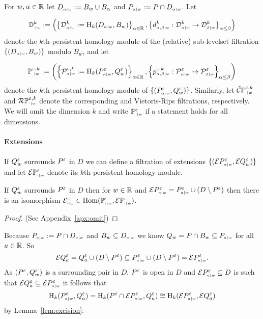 For $w,\alpha\in\R$ let $D\subi{w}{\alpha} := B_w\cup B_\alpha$ and $P\subi{w}{\alpha} := P\cap D\subi{w}{\alpha}$.
%
Let

\[ \DD{w}^k := \left(\left\{\D{w}{\alpha}^k := \hom_k(D\subi{w}{\alpha},B_w)\right\}_{\alpha\in\R},\left\{d\subi{w}{\alpha,\beta}^k : \D{w}{\alpha}^k\to\D{w}{\beta}^k\right\}_{\alpha\leq\beta}\right)\]
denote the $k$th persistent homology module of the (relative) sub-levelset filtration $\{(D\subi{w}{\alpha},B_w)\}$ modulo $B_w$, and let

\[\PP{w}{\e,k} := \left(\left\{\P{w}{\e,k}{\alpha} := \hom_k(P\subi{w}{\alpha}^\e,Q_w^\e)\right\}_{\alpha\in\R}, \left\{p\subi{w}{\alpha,\beta}^{\e,k} : \P{w}{\e}{\alpha}\to\P{w}{\e}{\beta}\right\}_{\alpha\leq\beta}\right)\]
denote the $k$th persistent homology module of $\{(P\subi{w}{\alpha}^\e,Q_w^\e)\}$.
Similarly, let $\CPP{w}{\e,k}$ and $\RPP{w}{\e,k}$ denote the corresponding \Cech and Vietoris-Rips filtrations, respectively.
We will omit the dimension $k$ and write $\PP{w}{\e}$ if a statement holds for all dimensions.

\paragraph{Extensions}

If $Q_w^\e$ surrounds $P^\e$ in $D$ we can define a filtration of extensions $\{(\ext{P\subi{w}{\alpha}^\e},\ext{Q_w^\e})\}$ and let $\ext{\PP{w}{\e}}$ denote its $k$th persistent homology module.

\begin{lemma}\label{lem:extension_apply}
  If $Q_w^\e$ surrounds $P^\e$ in $D$ then for $w\in\R$ and $\ext{P\subi{w}{a}^\e} = P\subi{w}{a}^\e \cup (D\setminus P^\e)$ then there is an isomorphism $\E\subi{w}{\cdot}^\e \in \Hom(\PP{w}{\e},\ext{\PP{w}{\e}})$.
\end{lemma}\begin{proof}
  (See Appendix~\ref{apx:omit})
\end{proof}
\proofatend
  Because $P\subi{w}{a} := P\cap D\subi{w}{a}$ and $B_w\subseteq D\subi{w}{a}$ we know $Q_w = P\cap B_w \subseteq P\subi{w}{a}$ for all $a\in\R$.
  So
  \[\ext{Q^\e_a} = Q^\e_a\cup (D\setminus P^\e) \subseteq P\subi{w}{a}^\e \cup (D\setminus P^\e) = \ext{P\subi{w}{a}^\e}.\]
  As $(P^\e, Q_w^\e)$ is a surrounding pair in $D$, $P^\e$ is open in $D$ and $\ext{P\subi{w}{a}^\e}\subseteq D$ is such that $\ext{Q^\e_a}\subseteq \ext{P\subi{w}{a}^\e}$ it follows that
  \[\hom_k(P\subi{w}{a}^\e, Q^\e_a) = \hom_k(P^\e\cap \ext{P\subi{w}{a}^\e}, Q^\e_a) \cong\hom_k(\ext{P\subi{w}{a}^\e}, \ext{Q^\e_a})\]
  by Lemma~\ref{lem:excision}.

